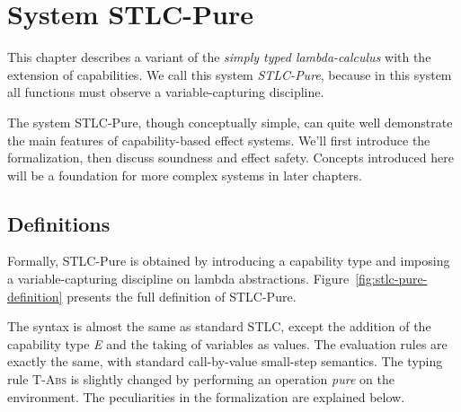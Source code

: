 \section{System STLC-Pure}

This chapter describes a variant of the \emph{simply typed
  lambda-calculus} with the extension of capabilities. We call this
system \emph{STLC-Pure}, because in this system all functions must
observe a variable-capturing discipline.


The system STLC-Pure, though conceptually simple, can quite well
demonstrate the main features of capability-based effect
systems. We'll first introduce the formalization, then discuss
soundness and effect safety. Concepts introduced here will be a
foundation for more complex systems in later chapters.

\subsection{Definitions}

Formally, STLC-Pure is obtained by introducing a capability type and
imposing a variable-capturing discipline on lambda abstractions.
Figure~\ref{fig:stlc-pure-definition} presents the full definition of
STLC-Pure.

The syntax is almost the same as standard STLC, except the addition of
the capability type \emph{E} and the taking of variables as
values. The evaluation rules are exactly the same, with standard
call-by-value small-step semantics. The typing rule \textsc{T-Abs} is
slightly changed by performing an operation \emph{pure} on the
environment. The peculiarities in the formalization are explained
below.

